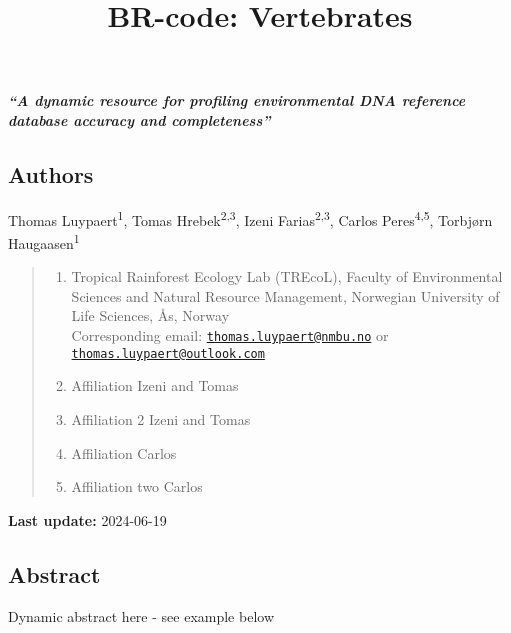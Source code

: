 \documentclass[
  letterpaper,
  DIV=11,
  numbers=noendperiod]{scrartcl}
\title{BR-code: Vertebrates}
\author{}
\date{}
\begin{document}
\maketitle

\textbf{\emph{``A dynamic resource for profiling environmental DNA
reference database accuracy and completeness''}}

\subsection{Authors}\label{authors}

Thomas Luypaert\textsuperscript{1}, Tomas Hrebek\textsuperscript{2,3},
Izeni Farias\textsuperscript{2,3}, Carlos Peres\textsuperscript{4,5},
Torbjørn Haugaasen\textsuperscript{1}

\begin{quote}
\begin{enumerate}
\def\labelenumi{(\arabic{enumi})}
\item
  Tropical Rainforest Ecology Lab (TREcoL), Faculty of Environmental
  Sciences and Natural Resource Management, Norwegian University of Life
  Sciences, Ås, Norway\\
  Corresponding email:
  \href{mailto:thomas.luypaert@nmbu.no}{\nolinkurl{thomas.luypaert@nmbu.no}}
  or
  \href{mailto:thomas.luypaert@outlook.com}{\nolinkurl{thomas.luypaert@outlook.com}}
\item
  Affiliation Izeni and Tomas
\item
  Affiliation 2 Izeni and Tomas
\item
  Affiliation Carlos
\item
  Affiliation two Carlos
\end{enumerate}
\end{quote}

\textbf{Last update:} 2024-06-19

\subsection{Abstract}\label{abstract}

Dynamic abstract here - see example below
\end{document}
